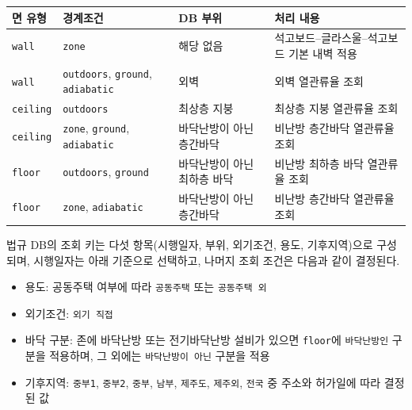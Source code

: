 \begin{defaulttable}
  \caption{\texttt{@vintage\_regulation} 면의 법규 DB 부위 결정}
  \label{tbl:unknown-surface-part-mapping}
  {\small
  \begin{tabularx}{\textwidth}{lllX}
    \toprule
    면 유형 & 경계조건 & DB 부위 & 처리 내용 \\ \midrule
    \texttt{wall}
      & \texttt{zone}
      & 해당 없음
      & 석고보드--글라스울--석고보드 기본 내벽 적용 \\

    \texttt{wall}
      & \texttt{outdoors}, \texttt{ground}, \texttt{adiabatic}
      & 외벽
      & 외벽 열관류율 조회 \\

    \texttt{ceiling}
      & \texttt{outdoors}
      & 최상층 지붕
      & 최상층 지붕 열관류율 조회 \\

    \texttt{ceiling}
      & \texttt{zone}, \texttt{ground}, \texttt{adiabatic}
      & 바닥난방이 아닌 층간바닥
      & 비난방 층간바닥 열관류율 조회 \\

    \texttt{floor}
      & \texttt{outdoors}, \texttt{ground}
      & 바닥난방이 아닌 최하층 바닥
      & 비난방 최하층 바닥 열관류율 조회 \\

    \texttt{floor}
      & \texttt{zone}, \texttt{adiabatic}
      & 바닥난방이 아닌 층간바닥
      & 비난방 층간바닥 열관류율 조회 \\
    \bottomrule
  \end{tabularx}
  }
\end{defaulttable}

법규 DB의 조회 키는 다섯 항목(시행일자, 부위, 외기조건, 용도, 기후지역)으로 구성되며, 시행일자는 아래 기준으로 선택하고, 나머지 조회 조건은 다음과 같이 결정된다.

\begin{itemize}
  \item 용도: 공동주택 여부에 따라 \texttt{공동주택} 또는 \texttt{공동주택 외}
  \item 외기조건: \texttt{외기 직접}
  \item 바닥 구분: 존에 바닥난방 또는 전기바닥난방 설비가 있으면 \texttt{floor}에 \texttt{바닥난방인} 구분을 적용하며, 그 외에는 \texttt{바닥난방이 아닌} 구분을 적용
  \item 기후지역: \texttt{중부1}, \texttt{중부2}, \texttt{중부}, \texttt{남부}, \texttt{제주도}, \texttt{제주외}, \texttt{전국} 중 주소와 허가일에 따라 결정된 값
\end{itemize}

